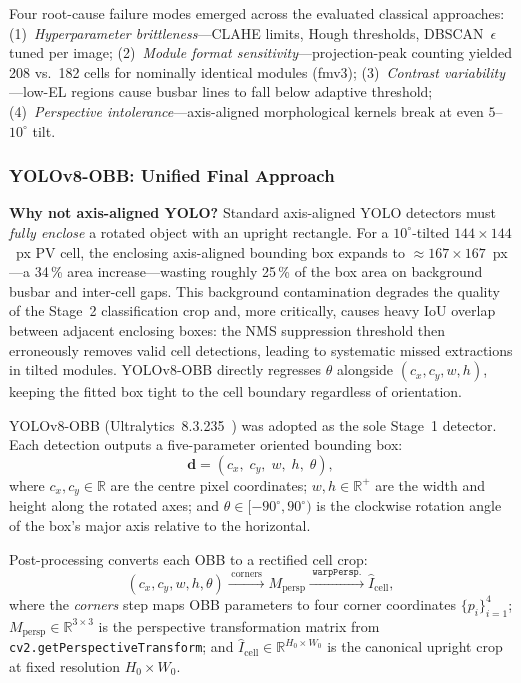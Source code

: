 \documentclass[conference]{IEEEtran}
\begin{document}
Four root-cause failure modes emerged across the evaluated classical approaches: (1)~\textit{Hyperparameter brittleness}---CLAHE limits, Hough thresholds, DBSCAN~$\epsilon$ tuned per image; (2)~\textit{Module format sensitivity}---projection-peak counting yielded 208 vs.\ 182 cells for nominally identical modules (fmv3); (3)~\textit{Contrast variability}---low-EL regions cause busbar lines to fall below adaptive threshold; (4)~\textit{Perspective intolerance}---axis-aligned morphological kernels break at even $5$--$10^\circ$ tilt.

\subsubsection{YOLOv8-OBB: Unified Final Approach}
\label{sec:yolo}

\textbf{Why not axis-aligned YOLO?} Standard axis-aligned YOLO detectors must \textit{fully enclose} a rotated object with an upright rectangle. For a $10^\circ$-tilted $144\times144$~px PV cell, the enclosing axis-aligned bounding box expands to $\approx$$\!167\times167$~px---a 34\,\% area increase---wasting roughly 25\,\% of the box area on background busbar and inter-cell gaps. This background contamination degrades the quality of the Stage~2 classification crop and, more critically, causes heavy IoU overlap between adjacent enclosing boxes: the NMS suppression threshold then erroneously removes valid cell detections, leading to systematic missed extractions in tilted modules. YOLOv8-OBB directly regresses $\theta$ alongside $(c_x, c_y, w, h)$, keeping the fitted box tight to the cell boundary regardless of orientation.

YOLOv8-OBB (Ultralytics~8.3.235~\cite{jocher2023}) was adopted as the sole Stage~1 detector. Each detection outputs a five-parameter oriented bounding box:
\begin{equation}
  \mathbf{d} = (c_x,\; c_y,\; w,\; h,\; \theta),
  \label{eq:obb}
\end{equation}
where $c_x, c_y \in \mathbb{R}$ are the centre pixel coordinates; $w, h \in \mathbb{R}^{+}$ are the width and height along the rotated axes; and $\theta \in [-90^\circ, 90^\circ)$ is the clockwise rotation angle of the box's major axis relative to the horizontal.

Post-processing converts each OBB to a rectified cell crop:
\begin{equation}
  (c_x, c_y, w, h, \theta)
  \xrightarrow{\;\text{corners}\;}
  M_{\text{persp}}
  \xrightarrow{\;\texttt{warpPersp.}\;}
  \hat{I}_{\text{cell}},
  \label{eq:postproc}
\end{equation}
where the \textit{corners} step maps OBB parameters to four corner coordinates $\{p_i\}_{i=1}^{4}$; $M_{\text{persp}} \in \mathbb{R}^{3\times3}$ is the perspective transformation matrix from \texttt{cv2.getPerspectiveTransform}; and $\hat{I}_{\text{cell}} \in \mathbb{R}^{H_0 \times W_0}$ is the canonical upright crop at fixed resolution $H_0 \times W_0$.
\end{document}
